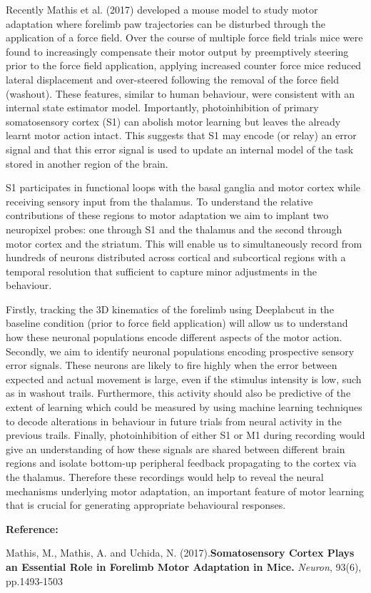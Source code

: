 \documentclass{article}
\begin{document}
Recently Mathis et al. (2017) developed a mouse model to study motor adaptation where forelimb paw trajectories can be disturbed through the application of a force field. Over the course of multiple force field trials mice were found to increasingly compensate their motor output by preemptively steering prior to the force field application, applying increased counter force mice reduced lateral displacement and over-steered following the removal of the force field (washout). These features, similar to human behaviour, were consistent with an internal state estimator model. Importantly, photoinhibition of primary somatosensory cortex (S1) can abolish motor learning but leaves the already learnt motor action intact. This suggests that S1 may encode (or relay) an error signal and that this error signal is used to update an internal model of the task stored in another region of the brain. 

S1 participates in functional loops with the basal ganglia and motor cortex while receiving sensory input from the thalamus. To understand the relative contributions of these regions to motor adaptation we aim to implant two neuropixel probes: one through S1 and the thalamus and the second through motor cortex and the striatum. This will enable us to simultaneously record from hundreds of neurons distributed across cortical and subcortical regions with a temporal resolution that sufficient to capture minor adjustments in the behaviour. 

Firstly, tracking the 3D kinematics of the forelimb using Deeplabcut in the baseline condition (prior to force field application) will allow us to understand how these neuronal populations encode different aspects of the motor action. Secondly, we aim to identify neuronal populations encoding prospective sensory error signals.  These neurons are likely to fire highly when the error between expected and actual movement is large, even if the stimulus intensity is low, such as in washout trails.  Furthermore, this activity should also be predictive of the extent of learning which could be measured by using machine learning techniques to decode alterations in behaviour in future trials from neural activity in the previous trails. Finally, photoinhibition of either S1 or M1 during recording would give an understanding of how these signals are shared between different brain regions and isolate bottom-up peripheral feedback propagating to the cortex via the thalamus. Therefore these recordings would help to reveal the neural mechanisms underlying motor adaptation, an important feature of motor learning that is crucial for generating appropriate behavioural responses.

\textbf{Reference:}

Mathis, M., Mathis, A. and Uchida, N. (2017).\textbf{Somatosensory Cortex Plays an Essential Role in Forelimb Motor Adaptation in Mice.} \textit{Neuron}, 93(6), pp.1493-1503
\end{document}
